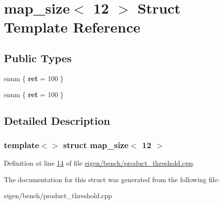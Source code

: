 \hypertarget{structmap__size_3_0112_01_4}{}\section{map\+\_\+size$<$ 12 $>$ Struct Template Reference}
\label{structmap__size_3_0112_01_4}
\subsection*{Public Types}
\begin{DoxyCompactItemize}
\item 
\mbox{\label{structmap__size_3_0112_01_4_a2a03c9cbbf2ca425c57a18c115878e5e}} 
enum \{ {\bfseries ret} = 100
 \}
\item 
\mbox{\label{structmap__size_3_0112_01_4_abc22ca3c1a5aa8be515dccae4abc386c}} 
enum \{ {\bfseries ret} = 100
 \}
\end{DoxyCompactItemize}


\subsection{Detailed Description}
\subsubsection*{template$<$$>$\newline
struct map\+\_\+size$<$ 12 $>$}



Definition at line \hyperlink{eigen_2bench_2product__threshold_8cpp_source_l00014}{14} of file \hyperlink{eigen_2bench_2product__threshold_8cpp_source}{eigen/bench/product\+\_\+threshold.\+cpp}.



The documentation for this struct was generated from the following file\+:\begin{DoxyCompactItemize}
\item 
eigen/bench/product\+\_\+threshold.\+cpp\end{DoxyCompactItemize}

